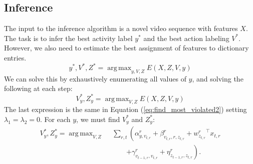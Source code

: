 \documentclass[10pt,letterpaper]{article}
\DeclareMathOperator*{\argmax}{arg\,max}
\newcommand{\+}[1]{\ensuremath{{\boldsymbol #1}}}
\begin{document}
\subsection{Inference}
The input to the inference algorithm is a novel video sequence with features
$X$. The task is to infer the best activity label $y^*$ and the best action
labeling $V^*$. However, we also need to estimate the best assignment of
features to dictionary entries.
\begin{equation}
  y^*, V^*, Z^* = \argmax_{y, V, Z} E(X, Z, V, y)
\end{equation}
We can solve this by exhaustively enumerating all values of $y$, and solving
the following at each step:
\begin{equation}
 V_y^*, Z_y^* = \argmax_{V,Z} E(X, Z, V, y)
\end{equation}
The last expression is the same in Equation (\ref{eq:find_most_violated2}) setting $\lambda_1 = \lambda_2 = 0$. For each $y$, we must find $V_y^*$ and $Z_y^*$:
\begin{equation}
\label{eq:inference2}
\begin{split}
 {V}_y^*, {Z}_y^*  = \argmax_{V,Z} ~~ &  \sum_{r,t} \left( \alpha^r_{y,v_{t,r}} 
                  + \beta^r_{v_{t,r},r,z_{t,r}} + {w^r_{z_{t,r}}}^\top x_{t,r} \right. \\
				& \quad\quad \left.+ \gamma^r_{v_{{t-1,r}},v_{t,r}}+ \eta^r_{z_{{t-1,r}},z_{t,r}}  \right).
\end{split}
\end{equation}

\end{document}

